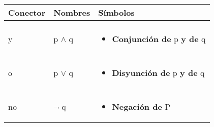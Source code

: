 \documentclass[12pt, fleqn]{report}                             %
\theoremstyle{break}                                            %
\begin{document}
            \begin{longtable}{p{30mm} || p{30mm} || p{80mm}}

                \textbf{\large Conector} & \textbf{\large Nombres} & \textbf{\large Símbolos} \\[1.5ex]
                \hline\hline & & \\                                                                    
                \endhead                                                     

                \large y  &  \large{p $\land$ q}                                            &

                \begin{minipage}[t]{\textwidth}\begin{itemize}
                    \item \textbf{Conjunción de} p \textbf{y de} q
                \end{itemize}\end{minipage}                                                 \\[1.5ex]
                
                \hline & & \\ \large o  &  \large{p $\lor$ q}                               &
                
                \begin{minipage}[t]{\textwidth}\begin{itemize}
                    \item \textbf{Disyunción de} p \textbf{y de} q
                \end{itemize}\end{minipage}                                                 \\[1.5ex]


                \hline & & \\ \large no  &  \large{$\lnot$ q}                               &

                \begin{minipage}[t]{\textwidth}\begin{itemize}
                    \item \textbf{Negación de} P
                \end{itemize}\end{minipage}                                                 \\[1.5ex]


\end{longtable}
\end{document}
